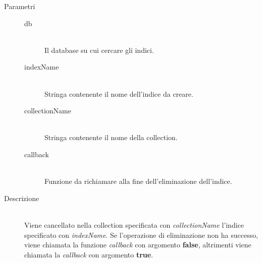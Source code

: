 \begin{description}
\begin{mldescription}
          \begin{description}
      	 \item[Parametri] \hfill
      	  \begin{description}
      	   \item[db] \hfill \\
      	   Il database su cui cercare gli indici.
      	   \item[indexName] \hfill \\
      	   Stringa contenente il nome dell'indice da creare.
      	   \item[collectionName] \hfill \\
      	   Stringa contenente il nome della collection.
      	   \item[callback] \hfill \\
      	   Funzione da richiamare alla fine dell'eliminazione dell'indice.
      	  \end{description}
      	 \item[Descrizione] \hfill \\
      	 Viene cancellato nella collection specificata con \textit{collectionName} l'indice specificato con \textit{indexName}. Se l'operazione di eliminazione non ha successo, viene chiamata la funzione \textit{callback} con argomento \textbf{false}, altrimenti viene chiamata la \textit{callback} con argomento \textbf{true}.  	 
      	\end{description} 	    
    
  \end{mldescription}
\end{description}

